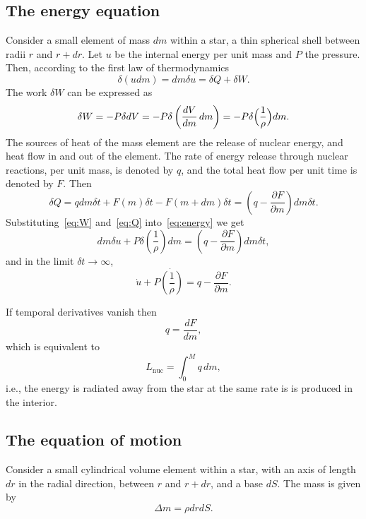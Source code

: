 \documentclass[10pt,amsmath,amssymb,aps,pra]{revtex4-2}
\newcommand{\di}{\partial} %
\begin{document}
\subsection{The energy equation}
Consider a small element of mass $dm$ within a star, a thin spherical shell
between radii $r$ and $r+dr$. Let $u$ be the internal energy per unit mass and
$P$ the pressure. Then, according to the first law of thermodynamics
\begin{equation}\label{eq:energy}
\delta(udm) = dm\delta{u} = \delta{Q} + \delta{W}.
\end{equation}
The work $\delta{W}$ can be expressed as
\begin{equation}\label{eq:W}
\delta{W} = -P\delta{d}V = -P\delta\left(\frac{dV}{dm}\,dm\right) =
-P\delta\Bigl(\frac{1}{\rho}\Bigr)dm.
\end{equation}
The sources of heat of the mass element are the release of nuclear energy, and
heat flow in and out of the element. The rate of energy release through nuclear
reactions, per unit mass, is denoted by $q$, and the total heat flow per unit
time is denoted by $F$. Then
\begin{equation}\label{eq:Q}
\delta{Q} = qdm\delta{t} + F(m)\delta{t} - F(m+dm)\delta{t} =
\left(q - \frac{\di{F}}{\di{m}}\right)dm\delta{t}.
\end{equation}
Substituting~\eqref{eq:W} and~\eqref{eq:Q} into~\eqref{eq:energy} we get
\begin{equation}
dm\delta{u} + P\delta\left(\frac{1}{\rho}\right)dm =
\left(q - \frac{\di{F}}{\di{m}}\right)dm\delta{t},
\end{equation}
and in the limit $\delta{t}\to\infty$,
\begin{equation}\label{eq:energy2}
\dot{u} + P\dot{\left(\frac{1}{\rho}\right)} = q - \frac{\di{F}}{\di{m}}.
\end{equation}

If temporal derivatives vanish then
\begin{equation}
q = \frac{dF}{dm},
\end{equation}
which is equivalent to
\begin{equation}
L_\text{nuc} = \int_0^Mq\,dm,
\end{equation}
i.e., the energy is radiated away from the star at the same rate is is produced
in the interior.

\subsection{The equation of motion}
Consider a small cylindrical volume element within a star, with an axis of
length $dr$ in the radial direction, between $r$ and $r+dr$, and a base $dS$.
The mass is given by
\begin{equation}\label{eq:delem}
\Delta{m} = \rho{d}rdS.
\end{equation}
\end{document}
